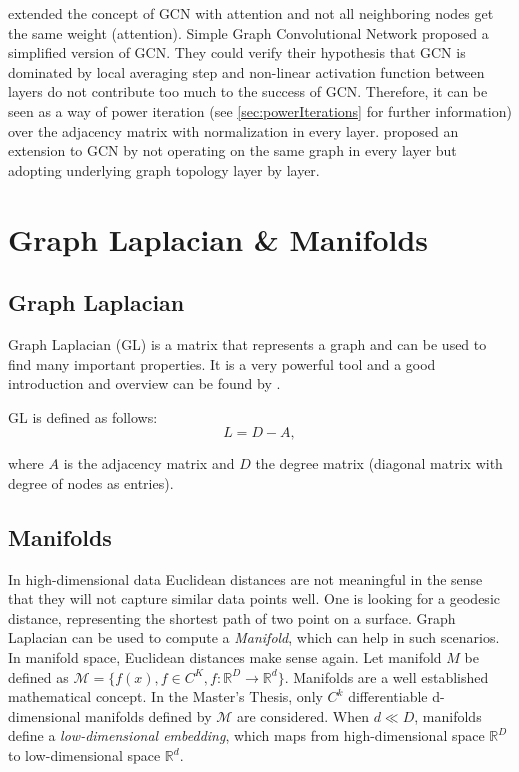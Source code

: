 \citet{GAT} extended the concept of GCN with attention and not all neighboring nodes get the same weight (attention).
Simple Graph Convolutional Network \cite{simpleGCN} proposed a simplified version of GCN.
They could verify their hypothesis that GCN is dominated by local averaging step and non-linear 
activation function between layers do not contribute too much to the success of GCN. 
Therefore, it can be seen as a way of power iteration (see \ref{sec:powerIterations} \textit{} for further information) over the adjacency matrix with normalization in every layer.
\citet{dynamicGCN} proposed an extension to GCN by not operating on the same graph in every layer but adopting
underlying graph topology layer by layer.

\section{Graph Laplacian \& Manifolds}
\subsection{Graph Laplacian}
Graph Laplacian (GL) is a matrix that represents a graph and can be used to find many important properties.
It is a very powerful tool and a good introduction and overview can be found by \cite{tutorialSpectralClustering, SpectralGraphTheory}. 

GL is defined as follows:
\begin{equation}
    \label{eq:gl}
    L = D - A,
\end{equation}

where $A$ is the adjacency matrix and $D$ the degree matrix (diagonal matrix with degree of nodes as entries).

\subsection{Manifolds}
\label{sec:manifolds}

In high-dimensional data Euclidean distances are not meaningful
in the sense that they will not capture similar data points well. One is looking for a geodesic distance, 
representing the shortest path of two point on a surface.
Graph Laplacian can be used to compute a \textit{Manifold}, which can help in such scenarios. 
In manifold space, Euclidean distances make sense again. 
Let manifold $M$ be defined as $\mathcal{M} = \{ f(x), f \in C^K, f: \mathbb{R}^D \to \mathbb{R}^d \}$.
Manifolds are a well established mathematical concept. In the Master's Thesis, only 
$C^k$ differentiable d-dimensional manifolds defined by $\mathcal{M}$ are considered. 
When $d \ll D$, manifolds define a \textit{low-dimensional embedding}, which maps from high-dimensional space 
$\mathbb{R}^D$ to low-dimensional space $\mathbb{R}^d$.

